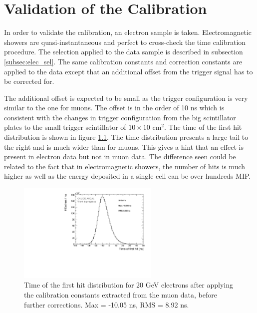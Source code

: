 \chapter{Validation of the Calibration}
\label{chap:TimingValidation}

In order to validate the calibration, an electron sample is taken. Electromagnetic showers are quasi-instantaneous and perfect to cross-check the time calibration procedure. The selection applied to the data sample is described in subsection \ref{subsec:elec_sel}. The same calibration constants and correction constants are applied to the data except that an additional offset from the trigger signal has to be corrected for.

The additional offset is expected to be small as the trigger configuration is very similar to the one for muons. The offset is in the order of 10 ns which is consistent with the changes in trigger configuration from the big scintillator plates to the small trigger scintillator of $10\times10$ cm$^2$. The time of the first hit distribution is shown in figure \ref{fig:Timing_electrons}. The time distribution presents a large tail to the right and is much wider than for muons. This gives a hint that an effect is present in electron data but not in muon data. The difference seen could be related to the fact that in electromagnetic showers, the number of hits is much higher as well as the energy deposited in a single cell can be over hundreds MIP.

\begin{figure}[htbp!]
	\centering
	\includegraphics[width=0.6\textwidth]{../Thesis_Plots/Timing/Electrons/Plots/Timing_AllLayers_AfterMuons.pdf}
	\caption{Time of the first hit distribution for 20 GeV electrons after applying the calibration constants extracted from the muon data, before further corrections. Max = -10.05 ns, RMS = 8.92 ns.}
	\label{fig:Timing_electrons}
\end{figure}

